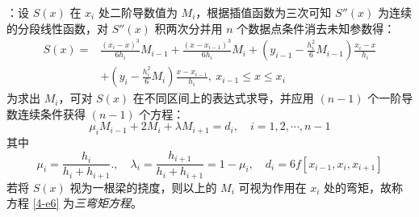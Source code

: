 \entry {}：设 $S(x)$ 在 $x_i$ 处二阶导数值为 $M_i$，根据插值函数为三次可知 $S''(x)$ 为连续的分段线性函数，对 $S''(x)$ 积两次分并用 $n$ 个数据点条件消去未知参数得：
\begin{equation}\label{4-e7}\begin{aligned}
S(x)=&\frac{(x_i-x)^3}{6h_i}M_{i-1}+\frac{(x-x_{i-1})^3}{6h_i}M_i+\left(y_{i-1}-\frac{h_i^2}6M_{i-1}\right)\frac{x_i-x}{h_i}\\
&+\left(y_i-\frac{h_i^2}6M_i\right)\frac{x-x_{i-1}}{h_i},\ x_{i-1}\leq x\leq x_i
\end{aligned}\end{equation}
为求出 $M_i$，可对 $S(x)$ 在不同区间上的表达式求导，并应用 $(n-1)$ 个一阶导数连续条件获得 $(n-1)$ 个方程：
\begin{equation}\label{4-e6}
\mu_iM_{i-1}+2M_i+\lambda M_{i+1}=d_i,\quad i=1,2,\cdots,n-1
\end{equation}
其中
\[
\mu_i=\frac{h_i}{h_i+h_{i+1}}.,\quad\lambda_i=\frac{h_{i+1}}{h_i+h_{i+1}}=1-\mu_i,\quad d_i=6f[x_{i-1},x_i,x_{i+1}]
\]
若将 $S(x)$ 视为一根梁的挠度，则以上的 $M_i$ 可视为作用在 $x_i$ 处的弯矩，故称方程 \eqref{4-e6} 为\emph{三弯矩方程}。

